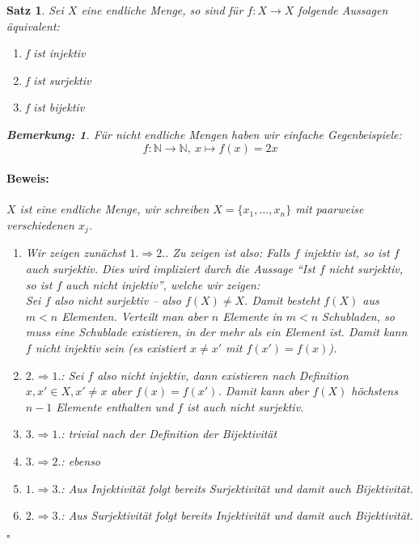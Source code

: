 \documentclass{report}
\newcommand{\N}{\mathbb{N}}
\theoremstyle{customrem}
\newtheorem*{bem}{Bemerkung:}
\theoremstyle{customdef}
\newtheorem{satz}[definition]{Satz}
\renewenvironment{proof}{\vspace{-.75cm}\paragraph{Beweis: }}{\vspace{-.5cm}\hfill$\square$}
\begin{document}
	\begin{satz}
		Sei $X$ eine endliche Menge, so sind für $f : X \to X$ folgende Aussagen äquivalent:
		\begin{enumerate}
			\itemsep0cm
			\item f ist injektiv 
			\item f ist surjektiv
			\item f ist bijektiv
		\end{enumerate}
		\begin{bem}
			Für nicht endliche Mengen haben wir einfache Gegenbeispiele:
			$$f : \N \to \N,\ x \mapsto f(x) = 2x$$
		\end{bem}
		\begin{proof}
			$X$ ist eine endliche Menge, wir schreiben $X = \{x_1, \dots, x_n\}$ mit paarweise verschiedenen $x_j$.
			\begin{enumerate}
				\item[i)] Wir zeigen zunächst $1. \Rightarrow 2.$. Zu zeigen ist also: Falls $f$ injektiv ist, so ist $f$ auch surjektiv. Dies wird impliziert durch die Aussage "`Ist $f$ \textit{nicht} surjektiv, so ist $f$ auch \textit{nicht} injektiv"', welche wir zeigen:\\
				Sei $f$ also nicht surjektiv -- also $f(X) \neq X$. Damit besteht $f(X)$ aus $m < n$ Elementen. Verteilt man aber $n$ Elemente in $m < n$ Schubladen, so muss eine Schublade existieren, in der mehr als ein Element ist. Damit kann $f$ nicht injektiv sein (es existiert $x \neq x'$ mit $f(x') = f(x)$).
				\item[ii)] $2. \Rightarrow 1.$: Sei $f$ also nicht injektiv, dann existieren nach Definition $x, x' \in X, x' \neq x$ aber $f(x) = f(x')$. Damit kann aber $f(X)$ höchstens $n-1$ Elemente enthalten und $f$ ist auch nicht surjektiv.
				\item[iii)] $3. \Rightarrow 1.$: trivial nach der Definition der Bijektivität
				\item[iv)] $3. \Rightarrow 2.$: ebenso
				\item[v)] $1. \Rightarrow 3.$: Aus Injektivität folgt bereits Surjektivität und damit auch Bijektivität.
				\item[vi)] $2. \Rightarrow 3.$: Aus Surjektivität folgt bereits Injektivität und damit auch Bijektivität.
			\end{enumerate}
		\end{proof}
	\end{satz}
	
\end{document}
